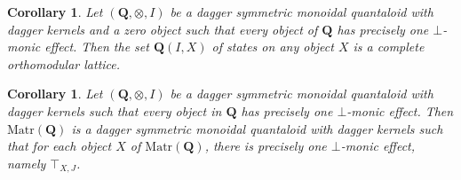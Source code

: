 \documentclass[12pt]{tac}
\newtheorem{corollary}[theorem]{Corollary}
\theoremstyle{definition}
\theoremstyle{remark}
\newcommand{\<}{\langle}
\renewcommand{\>}{\rangle}
\renewcommand{\:}{\colon}
\begin{document}
\begin{corollary}
    Let $(\mathbf Q,\otimes,I)$ be a  dagger symmetric monoidal quantaloid with dagger kernels and a zero object such that every object of $\mathbf Q$ has precisely one $\bot$-monic effect. Then the set $\mathbf Q(I,X)$ of states on any object $X$ is a complete orthomodular lattice.
\end{corollary}



\begin{corollary}\label{cor:QdaggerkernelsimplyMatrQdaggerkernels}
    Let $(\mathbf Q,\otimes,I)$ be a  dagger symmetric monoidal quantaloid with dagger kernels  such that every object in $\mathbf Q$ has precisely one $\bot$-monic effect. Then $\mathrm{Matr}(\mathbf Q)$ is a  dagger symmetric monoidal quantaloid with dagger kernels such that for each object $X$ of $\mathrm{Matr}(\mathbf Q)$, there is precisely one $\bot$-monic effect, namely $\top_{X,J}$. 
\end{corollary}
\end{document}
